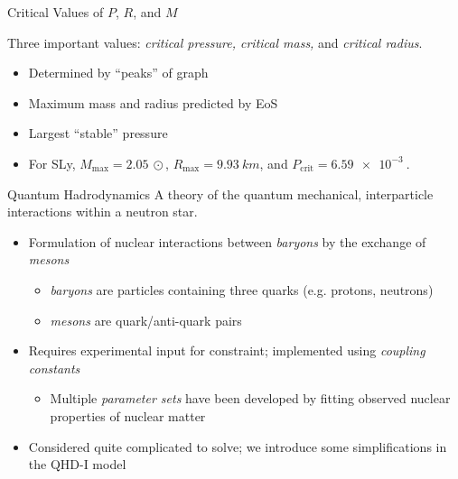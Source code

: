 \documentclass[]{beamer}
\begin{document}
\begin{frame}{Critical Values of $P$, $R$, and $M$}
\begin{figure}[h!]
\begin{subfigure}{.5\textwidth}
            \end{subfigure}
        \end{figure} \pause
        Three important values: \pause \textit{critical pressure, critical mass,} and \textit{critical radius}. \pause 
        \begin{itemize}
            \item Determined by ``peaks'' of graph \pause
            \item Maximum mass and radius predicted by EoS \pause
            \item Largest ``stable'' pressure \pause
            \item For SLy, $M_\text{max} = \SI{2.05}{\odot}$, $R_\text{max} = \SI{9.93}{km}$, and $P_\text{crit} = \SI{6.59e-3}{}$.
        \end{itemize}

    \end{frame}

    \begin{frame}{Quantum Hadrodynamics}
        \pause
        A theory of the quantum mechanical, interparticle interactions within a neutron star. \pause
        \begin{itemize}
            \item Formulation of nuclear interactions between \textit{baryons} by the exchange of \textit{mesons} \pause \begin{itemize}
                \item \textit{baryons} are particles containing three quarks (e.g. protons, neutrons) \pause
                \item \textit{mesons} are quark/anti-quark pairs\pause
            \end{itemize}
            \item Requires experimental input for constraint; \pause implemented using \textit{coupling constants} \pause \begin{itemize}
                \item Multiple \textit{parameter sets} have been developed by fitting observed nuclear properties of nuclear matter \pause
            \end{itemize}
            \item Considered quite complicated to solve\pause ; we introduce some simplifications in the QHD-I model
        \end{itemize}
    \end{frame}
\end{document}
